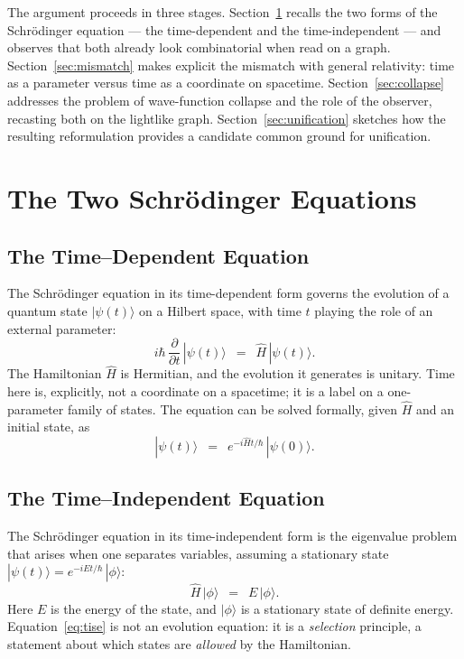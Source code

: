 \documentclass[11pt]{article}
\newcommand{\ket}[1]{|#1\rangle}
\begin{document}
The argument proceeds in three stages. Section~\ref{sec:schrodinger} recalls the two forms of the Schr\"odinger equation --- the time-dependent and the time-independent --- and observes that both already look combinatorial when read on a graph. Section~\ref{sec:mismatch} makes explicit the mismatch with general relativity: time as a parameter versus time as a coordinate on spacetime. Section~\ref{sec:collapse} addresses the problem of wave-function collapse and the role of the observer, recasting both on the lightlike graph. Section~\ref{sec:unification} sketches how the resulting reformulation provides a candidate common ground for unification.

\section{The Two Schr\"odinger Equations}
\label{sec:schrodinger}

\subsection{The Time--Dependent Equation}

The Schr\"odinger equation in its time-dependent form governs the evolution of a quantum state $\ket{\psi(t)}$ on a Hilbert space, with time $t$ playing the role of an external parameter:
\begin{equation}
i\hbar\,\frac{\partial}{\partial t}\,\ket{\psi(t)}
\;\:=\;\:
\hat{H}\,\ket{\psi(t)}.
\label{eq:tdse}
\end{equation}
The Hamiltonian $\hat{H}$ is Hermitian, and the evolution it generates is unitary. Time here is, explicitly, not a coordinate on a spacetime; it is a label on a one-parameter family of states. The equation can be solved formally, given $\hat{H}$ and an initial state, as
\begin{equation}
\ket{\psi(t)} \;\:=\;\: e^{-i\hat{H}t/\hbar}\,\ket{\psi(0)}.
\label{eq:evolution}
\end{equation}

\subsection{The Time--Independent Equation}

The Schr\"odinger equation in its time-independent form is the eigenvalue problem that arises when one separates variables, assuming a stationary state $\ket{\psi(t)} = e^{-iEt/\hbar}\,\ket{\phi}$:
\begin{equation}
\hat{H}\,\ket{\phi} \;\:=\;\: E\,\ket{\phi}.
\label{eq:tise}
\end{equation}
Here $E$ is the energy of the state, and $\ket{\phi}$ is a stationary state of definite energy. Equation~\eqref{eq:tise} is not an evolution equation: it is a \emph{selection} principle, a statement about which states are \emph{allowed} by the Hamiltonian.
\end{document}
